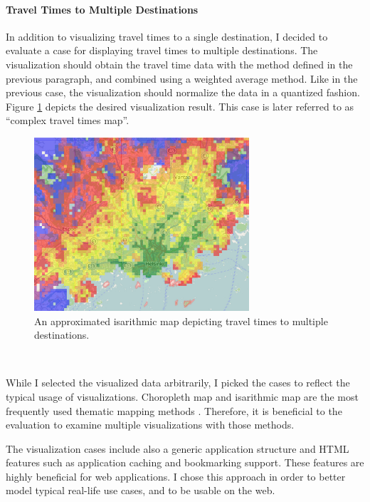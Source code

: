 \paragraph{Travel Times to Multiple Destinations}
In addition to visualizing travel times to a single destination, I decided to evaluate a case for displaying travel times to multiple destinations. The visualization should obtain the travel time data with the method defined in the previous paragraph, and combined using a weighted average method. Like in the previous case, the visualization should normalize the data in a quantized fashion. Figure \ref{fig:isarithmicimplcomplex} depicts the desired visualization result. This case is later referred to as ``complex travel times map''.

\begin{figure}[htbp]
  \begin{center}
    \includegraphics[width=8cm]{images/isarithmic-example-thematic-complex.png}
    \caption{An approximated isarithmic map depicting travel times to multiple destinations.}
    \label{fig:isarithmicimplcomplex}
  \end{center}
\end{figure}

~

While I selected the visualized data arbitrarily, I picked the cases to reflect the typical usage of visualizations. Choropleth map and isarithmic map are the most frequently used thematic mapping methods \citep[chap.~14-15]{slocum_thematic_2014}. Therefore, it is beneficial to the evaluation to examine multiple visualizations with those methods.

 The visualization cases include also a generic application structure and HTML features such as application caching and bookmarking support. These features are highly beneficial for web applications. I chose this approach in order to better model typical real-life use cases, and to be usable on the web.

